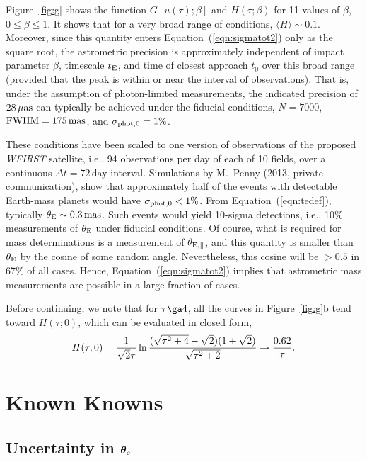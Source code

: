 \documentclass[12pt,preprint]{aastex}
\newcommand{\bdv}[1]{\mbox{\boldmath$#1$}}
\def\mas{{\rm mas}}
\def\fwhm{{\rm FWHM}}
\def\e{{\rm E}}
\def\btheta{{\bdv\theta}}
\def\muas{{\mu\rm as}}
\begin{document}
Figure~\ref{fig:g} shows the function $G[u(\tau);\beta]$ and
$H(\tau;\beta)$ for 11 values of $\beta$, $0\leq \beta \leq 1$.
It shows that for a very broad range of conditions, 
$\langle H\rangle\sim 0.1$.  Moreover, since this quantity enters
Equation~(\ref{eqn:sigmatot2}) only as the square root, the
astrometric precision is approximately independent of impact parameter
$\beta$, timescale $t_\e$, and time of closest approach $t_0$ over
this broad range (provided that the peak is within or near the
interval of observations).
That is, under the assumption of photon-limited
measurements, the indicated precision of $28\,\muas$ can typically
be achieved under the fiducial conditions, $N=7000$, $\fwhm=175\,\mas$,
and $\sigma_{{\rm phot},0}=1\%$.

These conditions have been scaled to one version of observations 
of the proposed {\it WFIRST} satellite, i.e., 94 observations per day
of each of 10 fields, over a continuous $\Delta t=72\,$day interval.
Simulations by M.\ Penny (2013, private communication), show that 
approximately half of the events with detectable Earth-mass planets would have
$\sigma_{{\rm phot},0} < 1\%$.  From Equation~(\ref{eqn:tedef}), typically
$\theta_\e\sim 0.3\,\mas$.  Such events would yield 10-sigma detections,
i.e., 10\% measurements of $\theta_\e$ under fiducial conditions.
Of course, what is required for mass determinations is a measurement
of $\theta_{\e,\parallel}$, and this quantity is smaller than $\theta_\e$
by the cosine of some random angle.  Nevertheless, this cosine will
be $>0.5$ in 67\% of all cases.  Hence, Equation~(\ref{eqn:sigmatot2})
implies that astrometric mass measurements are possible in a large
fraction of cases.

Before continuing, we note that for $\tau\ga 4$, all the curves in
Figure~\ref{fig:g}b tend toward $H(\tau;0)$, which can
be evaluated in closed form,
\begin{equation}
H(\tau,0) = 
{1\over\sqrt{2}\tau}
\ln {(\sqrt{\tau^2+4} -\sqrt{2})(1+\sqrt{2})\over \sqrt{\tau^2 +2}}
\rightarrow {0.62\over\tau}.
\label{eqn:hbeta0}
\end{equation}

\section{{Known Knowns}
\label{sec:known}}

\subsection{{Uncertainty in $\btheta_s$}
\label{sec:thetas}}
\end{document}
